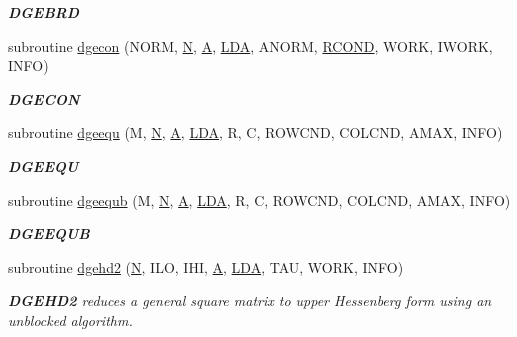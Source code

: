 \begin{DoxyCompactItemize}
\begin{DoxyCompactList}\small\item\em {\bfseries D\+G\+E\+B\+R\+D} \end{DoxyCompactList}\item 
subroutine \hyperlink{group__doubleGEcomputational_ga188b8d30443d14b1a3f7f8331d87ae60}{dgecon} (N\+O\+R\+M, \hyperlink{polmisc_8c_a0240ac851181b84ac374872dc5434ee4}{N}, \hyperlink{classA}{A}, \hyperlink{example__user_8c_ae946da542ce0db94dced19b2ecefd1aa}{L\+D\+A}, A\+N\+O\+R\+M, \hyperlink{superlu__enum__consts_8h_af00a42ecad444bbda75cde1b64bd7e72a9b5c151728d8512307565994c89919d5}{R\+C\+O\+N\+D}, W\+O\+R\+K, I\+W\+O\+R\+K, I\+N\+F\+O)
\begin{DoxyCompactList}\small\item\em {\bfseries D\+G\+E\+C\+O\+N} \end{DoxyCompactList}\item 
subroutine \hyperlink{group__doubleGEcomputational_ga56565ae06016954202aee24cdfc38257}{dgeequ} (M, \hyperlink{polmisc_8c_a0240ac851181b84ac374872dc5434ee4}{N}, \hyperlink{classA}{A}, \hyperlink{example__user_8c_ae946da542ce0db94dced19b2ecefd1aa}{L\+D\+A}, R, C, R\+O\+W\+C\+N\+D, C\+O\+L\+C\+N\+D, A\+M\+A\+X, I\+N\+F\+O)
\begin{DoxyCompactList}\small\item\em {\bfseries D\+G\+E\+E\+Q\+U} \end{DoxyCompactList}\item 
subroutine \hyperlink{group__doubleGEcomputational_ga4547be7cf34938979c5d741d148e4d3b}{dgeequb} (M, \hyperlink{polmisc_8c_a0240ac851181b84ac374872dc5434ee4}{N}, \hyperlink{classA}{A}, \hyperlink{example__user_8c_ae946da542ce0db94dced19b2ecefd1aa}{L\+D\+A}, R, C, R\+O\+W\+C\+N\+D, C\+O\+L\+C\+N\+D, A\+M\+A\+X, I\+N\+F\+O)
\begin{DoxyCompactList}\small\item\em {\bfseries D\+G\+E\+E\+Q\+U\+B} \end{DoxyCompactList}\item 
subroutine \hyperlink{group__doubleGEcomputational_ga976b17056c80d4aeed6438b4118d114a}{dgehd2} (\hyperlink{polmisc_8c_a0240ac851181b84ac374872dc5434ee4}{N}, I\+L\+O, I\+H\+I, \hyperlink{classA}{A}, \hyperlink{example__user_8c_ae946da542ce0db94dced19b2ecefd1aa}{L\+D\+A}, T\+A\+U, W\+O\+R\+K, I\+N\+F\+O)
\begin{DoxyCompactList}\small\item\em {\bfseries D\+G\+E\+H\+D2} reduces a general square matrix to upper Hessenberg form using an unblocked algorithm. \end{DoxyCompactList}\item 

\end{DoxyCompactItemize}
